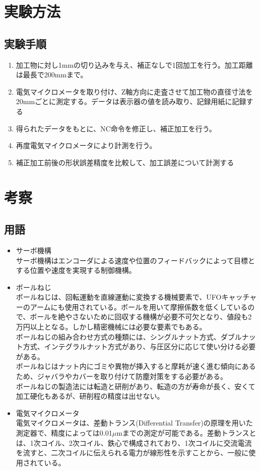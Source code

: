 \documentclass[a4j,twoside,openright,11pt]{jsarticle}
\begin{document}
\section{実験方法}
\subsection{実験手順}
\begin{enumerate}
\item 加工物に対し1mmの切り込みを与え、補正なしで1回加工を行う。加工距離は最長で200mmまで。
\item 電気マイクロメータを取り付け、Z軸方向に走査させて加工物の直径寸法を20mmごとに測定する。データは表示器の値を読み取り、記録用紙に記録する
\item 得られたデータをもとに、NC命令を修正し、補正加工を行う。
\item 再度電気マイクロメータにより計測を行う。
\item 補正加工前後の形状誤差精度を比較して、加工誤差について計測する
\end{enumerate}

\section{考察}
\subsection{用語}
\begin{itemize}
\item サーボ機構\\
  サーボ機構はエンコーダによる速度や位置のフィードバックによって目標とする位置や速度を実現する制御機構。
\item ボールねじ\\
  ボールねじは、回転運動を直線運動に変換する機械要素で、UFOキャッチャーのアームにも使用されている。ボールを用いて摩擦係数を低くしているので、ボールを絶やさないために回収する機構が必要不可欠となり、値段も2万円以上となる。しかし精密機械には必要な要素でもある。\\
  ボールねじの組み合わせ方式の種類には、シングルナット方式、ダブルナット方式、インテグラルナット方式があり、与圧区分に応じて使い分ける必要がある。\\
  ボールねじはナット内にゴミや異物が挿入すると摩耗が速く進む傾向にあるため、ジャバラやカバーを取り付けて防塵対策をする必要がある。\\
  ボールねじの製造法には転造と研削があり、転造の方が寿命が長く、安くて加工硬化もあるが、研削程の精度は出せない。
\item 電気マイクロメータ\\
  電気マイクロメータは、差動トランス(Differential Transfer)の原理を用いた測定器で、精度によっては0.01$\mu$mまでの測定が可能である。差動トランスとは、1次コイル、2次コイル、鉄心で構成されており、1次コイルに交流電流を流すと、二次コイルに伝えられる電力が線形性を示すことから、一般に使用されている。
\end{itemize}
\end{document}

